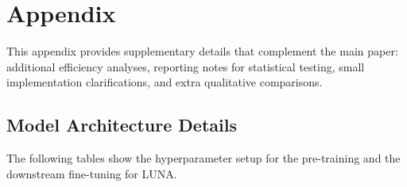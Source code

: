 \newpage
\appendix
\section{Appendix}
\label{sec:appendix}

This appendix provides supplementary details that complement the main paper: additional efficiency analyses, reporting notes for statistical testing, small implementation clarifications, and extra qualitative comparisons.

\subsection{Model Architecture Details}
\label{app:model_details}

The following tables show the hyperparameter setup for the pre-training and the downstream fine-tuning for LUNA.

